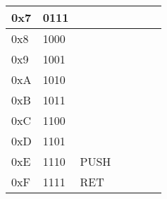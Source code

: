 \documentclass[a4paper]{article}
\begin{document}
\begin{table}[]
\begin{tabular}{|l|l|l|l|l|l|l|}
        0x7                 &   0111            &                       &           &           &           &           \\ \hline
        0x8                 &   1000            &                       &           &           &           &           \\ \hline
        0x9                 &   1001            &                       &           &           &           &           \\ \hline
        0xA                 &   1010            &                       &           &           &           &           \\ \hline
        0xB                 &   1011            &                       &           &           &           &           \\ \hline
        0xC                 &   1100            &                       &           &           &           &           \\ \hline
        0xD                 &   1101            &                       &           &           &           &           \\ \hline
        0xE                 &   1110            &   PUSH                &           &           &           &           \\ \hline
        0xF                 &   1111            &   RET                 &           &           &           &           \\ \hline
    \end{tabular}
\end{table}
\end{document}
